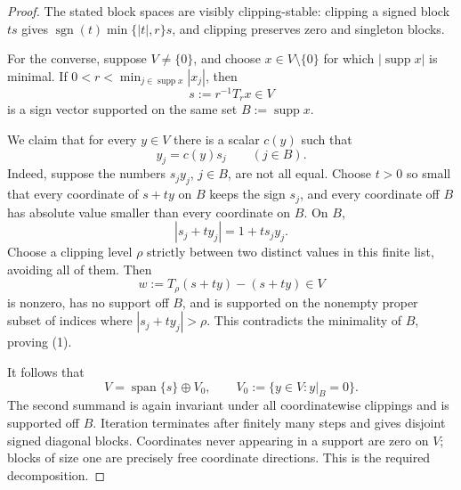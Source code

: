 \documentclass[11pt]{article}
\theoremstyle{definition}
\newcommand{\supp}{\operatorname{supp}}
\newcommand{\sgn}{\operatorname{sgn}}
\newcommand{\Span}{\operatorname{span}}
\begin{document}
\begin{proof}
The stated block spaces are visibly clipping-stable: clipping a signed block
\(t s\) gives \(\sgn(t)\min\{|t|,r\}s\), and clipping preserves zero and
singleton blocks.

For the converse, suppose \(V\ne\{0\}\), and choose \(x\in V\setminus\{0\}\)
for which \(|\supp x|\) is minimal.  If
\(0<r<\min_{j\in\supp x}|x_j|\), then
\[
 s:=r^{-1}T_r x\in V
\]
is a sign vector supported on the same set \(B:=\supp x\).

We claim that for every \(y\in V\) there is a scalar \(c(y)\) such that
\[
 y_j=c(y)s_j\qquad(j\in B).
\tag{1}
\]
Indeed, suppose the numbers \(s_jy_j\), \(j\in B\), are not all equal.
Choose \(t>0\) so small that every coordinate of \(s+ty\) on \(B\) keeps
the sign \(s_j\), and every coordinate off \(B\) has absolute value smaller
than every coordinate on \(B\).  On \(B\),
\[
 |s_j+ty_j|=1+t s_jy_j.
\]
Choose a clipping level \(\rho\) strictly between two distinct values in this
finite list, avoiding all of them.  Then
\[
 w:=T_\rho(s+ty)-(s+ty)\in V
\]
is nonzero, has no support off \(B\), and is supported on the nonempty proper
subset of indices where \(|s_j+ty_j|>\rho\).  This contradicts the minimality
of \(B\), proving (1).

It follows that
\[
 V=\Span\{s\}\oplus V_0,
 \qquad V_0:=\{y\in V:y|_B=0\}.
\]
The second summand is again invariant under all coordinatewise clippings and
is supported off \(B\).  Iteration terminates after finitely many steps and
gives disjoint signed diagonal blocks.  Coordinates never appearing in a
support are zero on \(V\); blocks of size one are precisely free coordinate
directions.  This is the required decomposition.
\end{proof}
\end{document}
